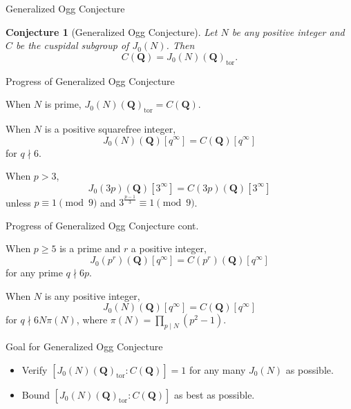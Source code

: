 \documentclass{beamer}
\newtheorem{conjecture}[theorem]{Conjecture}
\newcommand{\QQ}{\mathbf{Q}}
\newcommand{\tor}{\mathrm{tor}}
\begin{document}
\begin{frame}{Generalized Ogg Conjecture}
    \begin{conjecture}[Generalized Ogg Conjecture]
        Let $N$ be any positive integer and $C$ be the cuspidal subgroup of
        $J_0(N)$. Then
        \[
            C(\QQ) = J_0(N)(\QQ)_\tor.
        \]
    \end{conjecture}
\end{frame}

\begin{frame}{Progress of Generalized Ogg Conjecture}
    \begin{theorem}[Mazur '77]
        When $N$ is prime, $J_0(N)(\QQ)_\tor =C(\QQ)$.
    \end{theorem}
    \begin{theorem}[Ohta '14]
        When $N$ is a positive squarefree integer,
        \[
            J_0(N)(\QQ)[q^\infty]=C(\QQ)[q^\infty]
        \]
        for $q\nmid 6$.
    \end{theorem}
    \begin{theorem}[Yoo '15]
        When $p>3$,
        \[
            J_0(3p)(\QQ)[3^\infty] = C(3p)(\QQ)[3^\infty]
        \]
        unless $p\equiv 1 \pmod{9}$ and $3^{\frac{p-1}{3}} \equiv 1
        \pmod{9}$.
    \end{theorem}
\end{frame}

\begin{frame}{Progress of Generalized Ogg Conjecture cont.}
    \begin{theorem}[Ling '97]
        When $p\geq 5$ is a prime and $r$ a positive integer,
        \[
            J_0(p^r)(\QQ)[q^\infty] = C(p^r)(\QQ)[q^\infty]
        \]
        for any prime $q\nmid 6p$.
    \end{theorem}
    \begin{theorem}[Ren '18]
        When $N$ is any positive integer,
        \[
            J_0(N)(\QQ)[q^\infty]=C(\QQ)[q^\infty]
        \]
        for $q\nmid 6N\pi(N)$, where $\pi(N) = \prod_{p\mid N}
        (p^2-1)$.
    \end{theorem}
\end{frame}

\begin{frame}{Goal for Generalized Ogg Conjecture}
    \begin{itemize}
        \item
            Verify $[J_0(N)(\QQ)_\tor:C(\QQ)]=1$ for any many $J_0(N)$ as
            possible.
        \item
            Bound $[J_0(N)(\QQ)_\tor:C(\QQ)]$ as best as possible.
    \end{itemize}
\end{frame}
\end{document}
